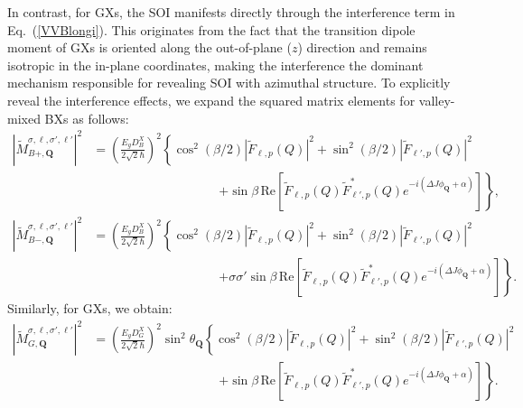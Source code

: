 In contrast, for GXs, the SOI manifests directly through the interference term in Eq.~(\ref{VVBlongi}). This originates from the fact that the transition dipole moment of GXs is oriented along the out-of-plane ($z$) direction and remains isotropic in the in-plane coordinates, making the interference the dominant mechanism responsible for revealing SOI with azimuthal structure.
To explicitly reveal the interference effects, we expand the squared matrix elements for valley-mixed BXs as follows:
\begin{equation}
\begin{aligned}
\left|\tilde{M}^{\sigma, \ell, \sigma', \ell'}_{B+, \boldsymbol{Q}}\right|^2
&= \left( \frac{E_g D^X_B}{2\sqrt{2}\hbar} \right)^2
\left\{
\cos^2(\beta/2) \left|\tilde{F}_{\ell, p}(Q)\right|^2
+ \sin^2(\beta/2)\left|\tilde{F}_{\ell', p}(Q)\right|^2 \right. \\
&\hspace{10em}\left.
+ \sin\beta \,
\mathrm{Re}\left[
\tilde{F}_{\ell, p}(Q)\tilde{F}^*_{\ell', p}(Q)
e^{-i(\Delta J \phi_{\boldsymbol{Q}} + \alpha)}
\right]
\right\}, \\
\left|\tilde{M}^{\sigma, \ell, \sigma', \ell'}_{B-, \boldsymbol{Q}}\right|^2
&= \left( \frac{E_g D^X_B}{2\sqrt{2}\hbar} \right)^2
\left\{
\cos^2(\beta/2) \left|\tilde{F}_{\ell, p}(Q)\right|^2
+ \sin^2(\beta/2)\left|\tilde{F}_{\ell', p}(Q)\right|^2 \right. \\
&\hspace{10em}\left.
+ \sigma\sigma'\sin\beta \,
\mathrm{Re}\left[
\tilde{F}_{\ell, p}(Q)\tilde{F}^*_{\ell', p}(Q)
e^{-i(\Delta J \phi_{\boldsymbol{Q}} + \alpha)}
\right]
\right\}.
\end{aligned}
\label{expanded_B}
\end{equation}
Similarly, for GXs, we obtain:
\begin{equation}
\begin{aligned}
\left|\tilde{M}^{\sigma, \ell, \sigma', \ell'}_{G, \boldsymbol{Q}}\right|^2
&= \left( \frac{E_g D^X_G}{2\sqrt{2}\hbar} \right)^2
\sin^2\theta_{\boldsymbol{Q}}
\left\{
\cos^2(\beta/2) \left|\tilde{F}_{\ell, p}(Q)\right|^2
+ \sin^2(\beta/2)\left|\tilde{F}_{\ell', p}(Q)\right|^2 \right. \\
&\hspace{10em}\left.
+ \sin\beta \,
\mathrm{Re}\left[
\tilde{F}_{\ell, p}(Q)\tilde{F}^*_{\ell', p}(Q)
e^{-i(\Delta J \phi_{\boldsymbol{Q}} + \alpha)}
\right]
\right\}.
\end{aligned}
\label{expanded_G}
\end{equation}

